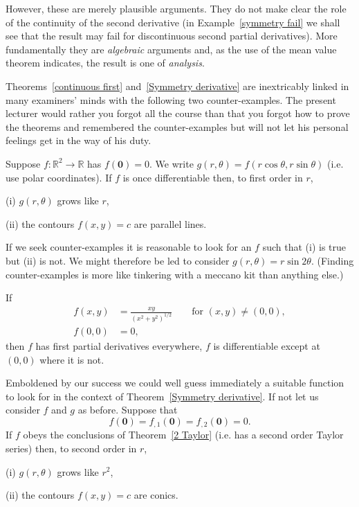 \noindent However, these are merely plausible arguments.
They do not make clear the role of the continuity
of the second derivative (in Example~\ref{symmetry fail}
we shall see that the result
may fail for discontinuous second partial derivatives).
More fundamentally they are \emph{algebraic} arguments
and, as the use of the mean value theorem indicates,
the result is one of \emph{analysis}. 

Theorems~\ref{continuous first} and~\ref{Symmetry derivative}
are inextricably linked in many examiners' minds with the
following two counter-examples. The present lecturer
would rather you forgot all the course than that
you forgot how to prove the theorems and remembered
the counter-examples but will not let his personal
feelings get in the way of his duty.

Suppose $f:{\mathbb R}^{2}\rightarrow{\mathbb R}$
has $f({\mathbf 0})=0$. We write 
$g(r,\theta)=f(r\cos\theta,r\sin\theta)$ 
(i.e. use polar coordinates). 
If $f$ is once differentiable then, to first order in $r$,

(i) $g(r,\theta)$ grows like $r$,

(ii) the contours $f(x,y)=c$ are parallel lines.

\noindent If we seek counter-examples it is reasonable
to look for an $f$ such that (i) is true but (ii) is not.
We might therefore be led to consider
$g(r,\theta)=r\sin 2\theta$. (Finding counter-examples
is more like tinkering with a meccano kit than anything else.)
\begin{example}\label{Jacob not} If
\begin{align*}
f(x,y)&=\frac{xy}{(x^{2}+y^{2})^{1/2}}\qquad\text{for $(x,y)\neq (0,0)$},\\
f(0,0)&=0,
\end{align*}
then $f$ has first partial derivatives everywhere,
$f$ is differentiable except at $(0,0)$ where
it is not.
\end{example}

Emboldened by our success we could well guess immediately
a suitable function to look for in the context of 
Theorem~\ref{Symmetry derivative}. If not
let us consider $f$ and $g$ as before. Suppose that
\[f({\mathbf 0})=f_{,1}({\mathbf 0})=f_{,2}({\mathbf 0})=0.\]
If $f$ obeys the conclusions of Theorem~\ref{2 Taylor}
(i.e. has a second order Taylor series) then,
to second order in $r$, 

(i) $g(r,\theta)$ grows like $r^{2}$,

(ii) the contours $f(x,y)=c$ are conics.

